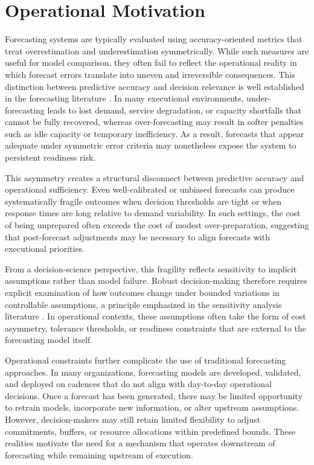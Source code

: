 \section{Operational Motivation}

Forecasting systems are typically evaluated using accuracy-oriented metrics that
treat overestimation and underestimation symmetrically. While such measures are
useful for model comparison, they often fail to reflect the operational reality
in which forecast errors translate into uneven and irreversible consequences.
This distinction between predictive accuracy and decision relevance is well
established in the forecasting literature \citep{gneiting2011}.
In many executional environments, under-forecasting leads to lost demand, service
degradation, or capacity shortfalls that cannot be fully recovered, whereas
over-forecasting may result in softer penalties such as idle capacity or
temporary inefficiency. As a result, forecasts that appear adequate under
symmetric error criteria may nonetheless expose the system to persistent
readiness risk.

This asymmetry creates a structural disconnect between predictive accuracy and
operational sufficiency. Even well-calibrated or unbiased forecasts can produce
systematically fragile outcomes when decision thresholds are tight or when
response times are long relative to demand variability. In such settings, the
cost of being unprepared often exceeds the cost of modest over-preparation,
suggesting that post-forecast adjustments may be necessary to align forecasts
with executional priorities.

From a decision-science perspective, this fragility reflects sensitivity to
implicit assumptions rather than model failure. Robust decision-making therefore
requires explicit examination of how outcomes change under bounded variations
in controllable assumptions, a principle emphasized in the sensitivity analysis
literature \citep{saltelli2008}. In operational contexts, these assumptions often
take the form of cost asymmetry, tolerance thresholds, or readiness constraints
that are external to the forecasting model itself.

Operational constraints further complicate the use of traditional forecasting
approaches. In many organizations, forecasting models are developed, validated,
and deployed on cadences that do not align with day-to-day operational decisions.
Once a forecast has been generated, there may be limited opportunity to retrain
models, incorporate new information, or alter upstream assumptions. However,
decision-makers may still retain limited flexibility to adjust commitments,
buffers, or resource allocations within predefined bounds. These realities
motivate the need for a mechanism that operates downstream of forecasting while
remaining upstream of execution.

